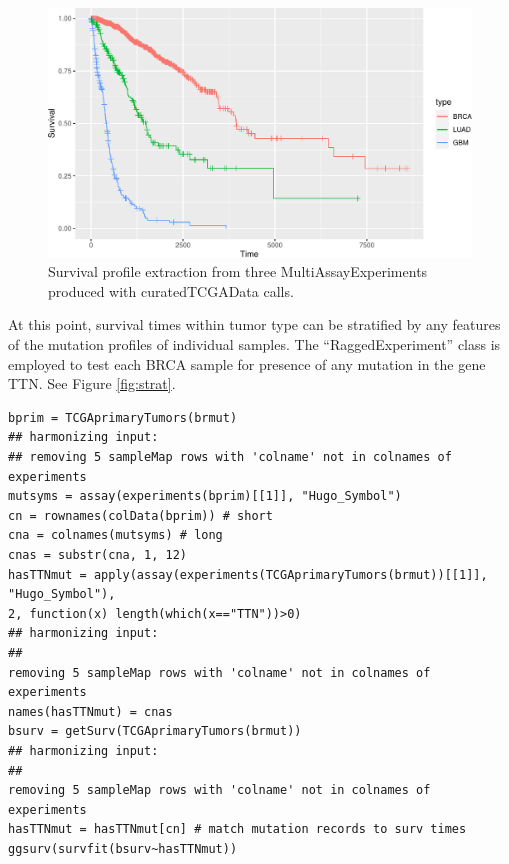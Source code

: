 \begin{figure}
\includegraphics[width=0.8\linewidth,]{bioccb_files/figure-latex/dothesurv-1} \caption{Survival profile extraction from three MultiAssayExperiments produced with curatedTCGAData calls.}\label{fig:dothesurv}
\end{figure}

At this point, survival times within tumor type can be stratified by any
features of the mutation profiles of individual samples.
The ``RaggedExperiment'' class is employed to test each BRCA sample for
presence of any mutation in the gene TTN. See Figure \ref{fig:strat}.

\begin{shaded}
\begin{verbatim}
bprim = TCGAprimaryTumors(brmut)
## harmonizing input:
## removing 5 sampleMap rows with 'colname' not in colnames of experiments
mutsyms = assay(experiments(bprim)[[1]], "Hugo_Symbol")
cn = rownames(colData(bprim)) # short
cna = colnames(mutsyms) # long
cnas = substr(cna, 1, 12)
hasTTNmut = apply(assay(experiments(TCGAprimaryTumors(brmut))[[1]], "Hugo_Symbol"),
2, function(x) length(which(x=="TTN"))>0)
## harmonizing input:
##
removing 5 sampleMap rows with 'colname' not in colnames of experiments
names(hasTTNmut) = cnas
bsurv = getSurv(TCGAprimaryTumors(brmut))
## harmonizing input:
##
removing 5 sampleMap rows with 'colname' not in colnames of experiments
hasTTNmut = hasTTNmut[cn] # match mutation records to surv times
ggsurv(survfit(bsurv~hasTTNmut))
\end{verbatim}
\end{shaded}


